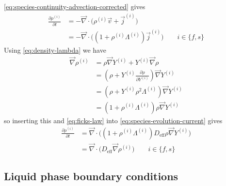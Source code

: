 \documentclass[11pt,twoside]{report}
\begin{document}
\eqref{eq:species-continuity-advection-corrected} gives
\begin{equation}\label{eq:species-evolution-current}
  \begin{aligned}
    \frac{\partial \rho^{(i)}}{\partial t} &=
    - \vec{\nabla} \cdot \Big(
    \rho^{(i)} \vec{v} + \vec{j}^{(i)}
    \Big)
    \\
    &=
    - \vec{\nabla} \cdot \Big(
    (1 + \rho^{(i)} \Lambda^{(i)}) \vec{j}^{(i)}
    \Big)
    \qquad i \in \{f,s\}
  \end{aligned}
\end{equation}
Using \eqref{eq:density-lambda} we have
\begin{equation*}
  \begin{aligned}
    \vec{\nabla} \rho^{(i)} &=
    \rho \vec{\nabla} Y^{(i)} +
    Y^{(i)} \vec{\nabla} \rho \\
    &=
    \left(
    \rho + Y^{(i)} \frac{\partial \rho}{\partial Y^{(i)}}
    \right)
    \vec{\nabla} Y^{(i)}
    \\
    &=
    \left(
    \rho +
    Y^{(i)} \rho^2 \Lambda^{(i)}
    \right)
    \vec{\nabla} Y^{(i)} \\
    &=
    \left(
    1 +
    \rho^{(i)} \Lambda^{(i)}
    \right)
    \rho
    \vec{\nabla} Y^{(i)}
  \end{aligned}
\end{equation*}
so inserting this and \eqref{eq:ficks-law} into \eqref{eq:species-evolution-current} gives
\begin{equation}\label{eq:species-evolution-final}
  \begin{aligned}
    \frac{\partial \rho^{(i)}}{\partial t} &=
    \vec{\nabla} \cdot \Big(
    (1 + \rho^{(i)} \Lambda^{(i)})
    D_{\textrm{eff}} \rho \vec{\nabla} Y^{(i)}
    \Big) \\
    &=
    \vec{\nabla} \cdot \Big(
    D_{\textrm{eff}} \vec{\nabla} \rho^{(i)}
    \Big)
    \qquad i \in \{f,s\}
  \end{aligned}
\end{equation}

\subsection{Liquid phase boundary conditions}
\end{document}

